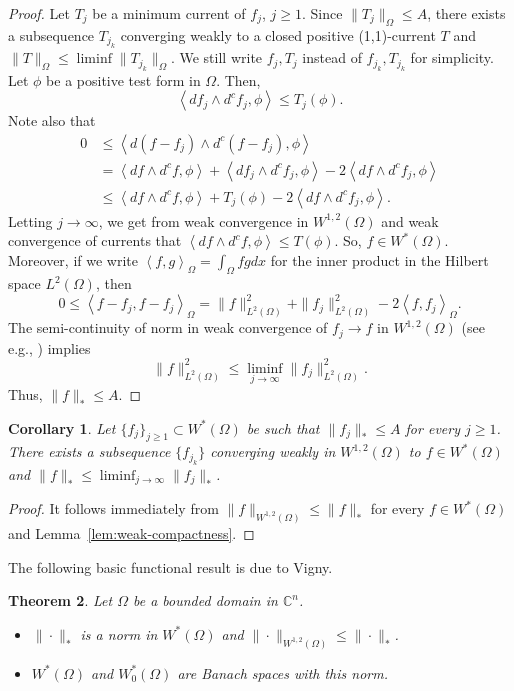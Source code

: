 \documentclass{amsart}
\newcommand{\lc}{\left<}
\newcommand{\rc}{\right>}
\newcommand{\Om}{\Omega}
\newcommand{\bC}{\mathbb{C}}
\newtheorem{thm}{Theorem}
\newtheorem{cor}[thm]{Corollary}
\theoremstyle{definition}
\numberwithin{thm}{section}
\numberwithin{equation}{section}
\renewcommand{\[}{\begin{equation}}
\renewcommand{\]}{\end{equation}}
\newcommand{\wed}{\wedge}
\begin{document}
\begin{proof} Let $T_j$ be a minimum current of $ f_j$, $j\geq 1$. Since $\|T_j \|_\Om \leq A$, there exists a subsequence $T_{j_k}$ converging weakly to a closed positive (1,1)-current $T$ and $\|T\|_\Om \leq \liminf \|T_{j_k}\|_\Om$. We still write  $ f_j, T_j$ instead of $f_{j_k}, T_{j_k}$ for simplicity. Let $\phi$ be a positive test form in $\Om$. Then,
$$
	\lc d f_{j} \wed d^c f_{j}, \phi\rc \leq T_{j} (\phi).
$$
Note also that
$$\begin{aligned}
0&\leq	\lc d (f- f_j) \wed d^c (f- f_j), \phi\rc  \\
&= \lc d f \wed d^c f, \phi \rc + \lc d f_j \wed d^c  f_j , \phi\rc - 2 \lc d f \wed d^c  f_j,\phi \rc \\
&\leq \lc d f \wed d^c f, \phi \rc + T_j(\phi) -  2 \lc d f\wed d^c  f_j,\phi \rc.
\end{aligned}$$
Letting $j \to \infty$, we get from weak convergence in $W^{1,2}(\Om)$ and weak convergence of currents that  $\lc d f \wed d^c f,  \phi \rc \leq T (\phi)$. So, 
$f \in W^*(\Om)$. Moreover, if we write $\lc f, g\rc_\Om = \int_\Om fg dx$ for the inner product in the Hilbert space $L^2(\Om)$, then
$$
	0 \leq \lc f -  f_j, f - f_j \rc_\Om =  \|f\|^2_{L^2(\Om)}+ \| f_j\|^2_{L^2(\Om)} - 2 \lc f,  f_j\rc_\Om.
$$
The semi-continuity of norm in weak convergence of $ f_j\to f$ in $W^{1,2}(\Om)$ (see e.g., \cite[Theorem~2.11]{LL-book}) implies $$  \|f\|^2_{L^2(\Om)} \leq  \liminf_{j\to \infty} \| f_j\|^2_{L^2(\Om)}.$$ Thus, $\|f\|_*\leq A$.
\end{proof}

\begin{cor} \label{cor:w-compactness}  Let $\{f_j \}_{j\geq 1} \subset W^*(\Om)$ be such that $\|f_j \|_* \leq A$ for every $j\geq 1$. There exists a subsequence $\{f_{j_k} \}$ converging weakly in $W^{1,2}(\Om)$ to $f \in W^*(\Om)$  and $\|f\|_* \leq \liminf_{j\to \infty} \|f_j\|_*$.
\end{cor}

\begin{proof} It follows immediately from $\|f\|_{W^{1,2}(\Om)} \leq \|f\|_*$ for every $f\in W^*(\Om)$ and Lemma~\ref{lem:weak-compactness}.
\end{proof}

The following basic functional result is due to Vigny\cite[Proposition~1]{Vigny}.
\begin{thm}\label{thm:star-norm} Let $\Om$ be a bounded domain in $\bC^n$.
\begin{itemize}
\item[(a)]  $\| \cdot\|_*$ is a norm in $W^*(\Om)$ and $\| \cdot \|_{W^{1,2}(\Om)} \leq \|\cdot \|_*$.
\item[(b)] $W^*(\Om)$ and $W^*_0(\Om)$ are Banach spaces with this norm.
\end{itemize}
\end{thm}
\end{document}
